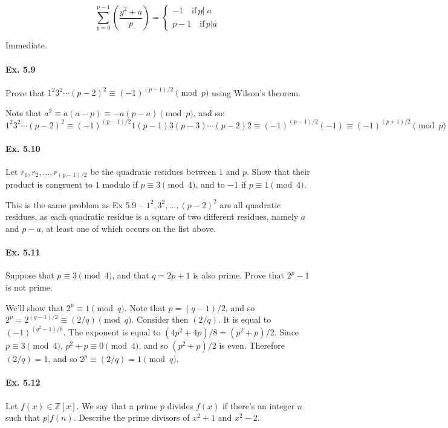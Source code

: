 \documentclass[notitlepage]{article}
\theoremstyle{definition}
\newcommand\Z{\mathbb{Z}}
\begin{document}
\begin{equation}
  \sum_{y=0}^{p-1} \left(\frac{y^2 +a}{p}\right) =
  \begin{cases}
    -1 \quad \textrm{if}\, p\not | \; a \\
    p-1 \quad \textrm{if}\, p | a
  \end{cases}
\end{equation}

Immediate.

\paragraph{Ex. 5.9}
Prove that $1^2 3^2 \cdots (p-2)^2 \equiv (-1)^{(p-1)/2} \pmod p$ using Wilson's theorem.

Note that $a^2 \equiv a(a-p) \equiv -a(p-a) \pmod p$, and so:
\begin{equation}
  1^2 3^2 \cdots (p-2)^2 \equiv (-1)^{(p-1)/2}
  1(p-1)3(p-3)\cdots(p-2)2 \equiv (-1)^{(p-1)/2} (-1) \equiv
  (-1)^{(p+1)/2} \pmod p
\end{equation}

\paragraph{Ex. 5.10}
Let $r_1, r_2, \ldots, r_{(p-1)/2}$ be the quadratic residues between
$1$ and $p$. Show that their product is congruent to $1$ modulo if $p
\equiv 3 \pmod 4$, and to $-1$ if $p \equiv 1 \pmod 4$.

This is the same problem as Ex 5.9 -- $1^2, 3^2, \ldots, (p-2)^2$ are
all quadratic residues, as each quadratic residue is a square of two
different residues, namely $a$ and $p-a$, at least one of which occurs
on the list above.

\paragraph{Ex. 5.11}
Suppose that $p \equiv 3 \pmod 4$, and that $q = 2p+1$ is also
prime. Prove that $2^p -1$ is not prime.

We'll show that $2^p \equiv 1 \pmod q$. Note that $p = (q-1)/2$, and
so $2^p = 2^{(q-1)/2} \equiv (2/q) \pmod q$. Consider then $(2/q)$. It
is equal to $(-1)^{(q^2 - 1)/8}$. The exponent is equal to $(4p^2 +
4p)/8 = (p^2 + p)/2$. Since $p \equiv 3 \pmod 4$, $p^2 + p \equiv 0
\pmod 4$, and so $(p^2 + p)/2$ is even. Therefore $(2/q) = 1$, and so
$2^p \equiv (2/q) = 1 \pmod q$.

\paragraph{Ex. 5.12}
Let $f(x) \in \Z[x]$. We say that a prime $p$ divides $f(x)$ if
there's an integer $n$ such that $p|f(n)$. Describe the prime divisors
of $x^2 + 1$ and $x^2 -2$.
\end{document}

